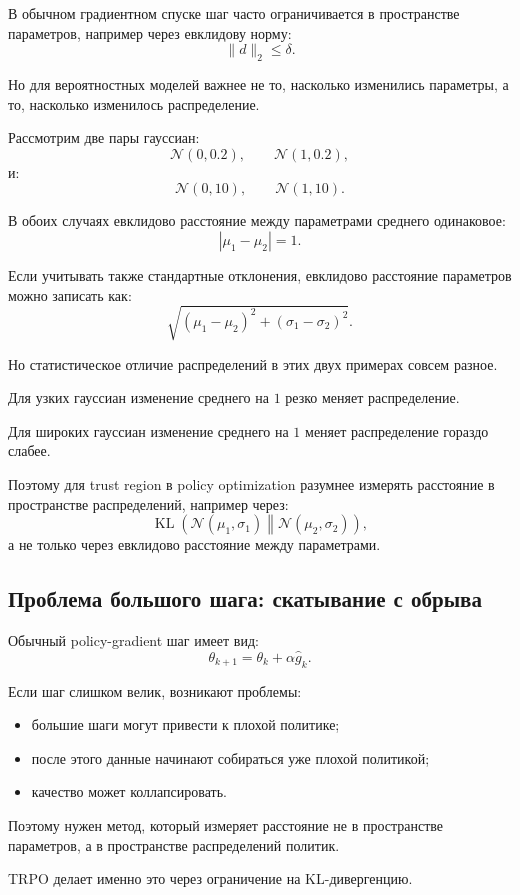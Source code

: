 \documentclass[12pt,a4paper]{article}
\begin{document}
В обычном градиентном спуске шаг часто ограничивается в пространстве параметров, например через евклидову норму:
\[
\|d\|_2\le \delta.
\]

Но для вероятностных моделей важнее не то, насколько изменились параметры, а то, насколько изменилось распределение.

Рассмотрим две пары гауссиан:
\[
\mathcal N(0,0.2),
\qquad
\mathcal N(1,0.2),
\]
и:
\[
\mathcal N(0,10),
\qquad
\mathcal N(1,10).
\]

В обоих случаях евклидово расстояние между параметрами среднего одинаковое:
\[
|\mu_1-\mu_2|=1.
\]

Если учитывать также стандартные отклонения, евклидово расстояние параметров можно записать как:
\[
\sqrt{
(\mu_1-\mu_2)^2
+
(\sigma_1-\sigma_2)^2
}.
\]

Но статистическое отличие распределений в этих двух примерах совсем разное.

Для узких гауссиан изменение среднего на $1$ резко меняет распределение.

Для широких гауссиан изменение среднего на $1$ меняет распределение гораздо слабее.

Поэтому для trust region в policy optimization разумнее измерять расстояние в пространстве распределений, например через:
\[
\operatorname{KL}
\left(
\mathcal N(\mu_1,\sigma_1)
\middle\|
\mathcal N(\mu_2,\sigma_2)
\right),
\]
а не только через евклидово расстояние между параметрами.

\subsection{Проблема большого шага: скатывание с обрыва}

Обычный policy-gradient шаг имеет вид:
\[
\theta_{k+1}
=
\theta_k
+
\alpha \hat g_k.
\]

Если шаг слишком велик, возникают проблемы:
\begin{itemize}
    \item большие шаги могут привести к плохой политике;
    \item после этого данные начинают собираться уже плохой политикой;
    \item качество может коллапсировать.
\end{itemize}

Поэтому нужен метод, который измеряет расстояние не в пространстве параметров, а в пространстве распределений политик.

TRPO делает именно это через ограничение на KL-дивергенцию.
\end{document}
